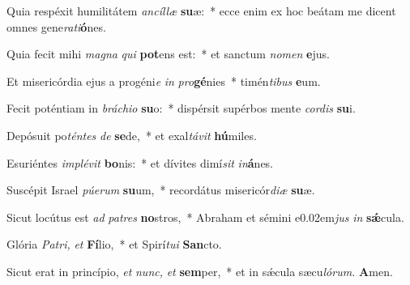 \item Quia respéxit humilitátem \textit{ancíllæ} \textbf{su}æ:~* ecce enim ex hoc beátam me dicent omnes gene\textit{rati}\textbf{ó}nes.
\item Quia fecit mihi \textit{magna} \textit{qui} \textbf{pot}ens est:~* et san\-ctum \textit{nomen} \textbf{e}jus.
\item Et misericórdia ejus a progéni\textit{e} \textit{in} \textit{pro}\textbf{gé}nies~* timén\textit{tibus} \textbf{e}um.
\item Fecit poténtiam in \textit{bráchio} \textbf{su}o:~* dispérsit supérbos mente \textit{cordis} \textbf{su}i.
\item Depósuit po\textit{téntes} \textit{de} \textbf{se}de,~* et exal\textit{távit} \textbf{hú}miles.
\item Esuriéntes \textit{implévit} \textbf{bo}nis:~* et dívites dimí\tinyhspace\textit{sit} \textit{in}\textbf{á}nes.
\item Suscépit Israel \textit{púerum} \textbf{su}um,~* recordátus misericór\textit{diæ} \textbf{su}æ.
\item Sicut locútus est \textit{ad} \textit{patres} \textbf{no}stros,~* Abraham et sémini e\kern 0.02em\textit{jus} \textit{in} \textbf{sǽ}cula.
\item Glória \textit{Patri,} \textit{et} \textbf{Fí}lio,~* et Spirí\tinyhspace\textit{tu}\textit{i} \textbf{San}cto.
\item Sicut erat in princípio, \textit{et} \textit{nunc,} \textit{et} \textbf{sem}per,~* et in sǽcula sæcu\tinyhspace\textit{lórum.} \textbf{A}men.